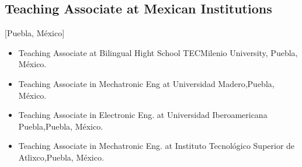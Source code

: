\documentclass{mycv}
\begin{document}
\subsection{Teaching Associate at Mexican Institutions}[Puebla, M\'exico]
\begin{itemize}
\item Teaching Associate at Bilingual Hight School TECMilenio University, Puebla, M\'exico.  
\item Teaching Associate in Mechatronic Eng at Universidad Madero,Puebla, M\'exico. 
\item Teaching Associate in Electronic Eng. at Universidad Iberoamericana Puebla,Puebla, M\'exico. 
\item Teaching Associate in Mechatronic Eng. at Instituto Tecnol\'ogico Superior de Atlixco,Puebla, M\'exico. 
\end{itemize}


%
\end{document}

